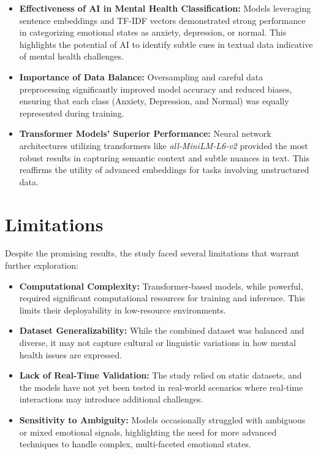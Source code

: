 \documentclass[runningheads,a4paper,11pt]{report}
\begin{document}
\begin{itemize}
    \item \textbf{Effectiveness of AI in Mental Health Classification:} Models leveraging sentence embeddings and TF-IDF vectors demonstrated strong performance in categorizing emotional states as anxiety, depression, or normal. This highlights the potential of AI to identify subtle cues in textual data indicative of mental health challenges.
    \item \textbf{Importance of Data Balance:} Oversampling and careful data preprocessing significantly improved model accuracy and reduced biases, ensuring that each class (Anxiety, Depression, and Normal) was equally represented during training.
    \item \textbf{Transformer Models' Superior Performance:} Neural network architectures utilizing transformers like \textit{all-MiniLM-L6-v2} provided the most robust results in capturing semantic context and subtle nuances in text. This reaffirms the utility of advanced embeddings for tasks involving unstructured data.
\end{itemize}

\section{Limitations}
Despite the promising results, the study faced several limitations that warrant further exploration:

\begin{itemize}
    \item \textbf{Computational Complexity:} Transformer-based models, while powerful, required significant computational resources for training and inference. This limits their deployability in low-resource environments.
    \item \textbf{Dataset Generalizability:} While the combined dataset was balanced and diverse, it may not capture cultural or linguistic variations in how mental health issues are expressed.
    \item \textbf{Lack of Real-Time Validation:} The study relied on static datasets, and the models have not yet been tested in real-world scenarios where real-time interactions may introduce additional challenges.
    \item \textbf{Sensitivity to Ambiguity:} Models occasionally struggled with ambiguous or mixed emotional signals, highlighting the need for more advanced techniques to handle complex, multi-faceted emotional states.
\end{itemize}
\end{document}
